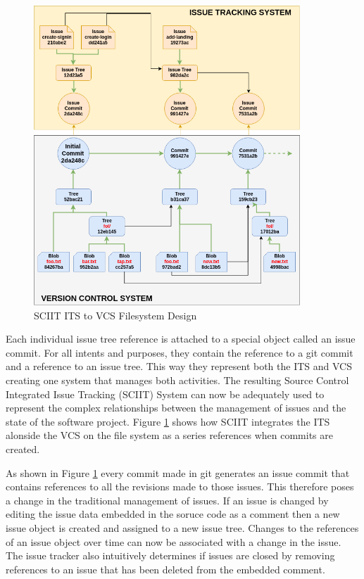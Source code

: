 \documentclass{mproj}
\begin{document}
\begin{figure}[t]
\caption{SCIIT ITS to VCS Filesystem Design}
\label{fig:sciit-filesystem}
\centering
\includegraphics[width=10cm]{sciit-filesystem}
\end{figure}


Each individual issue tree reference is attached to a special object called an issue commit. For all intents and purposes, they contain the reference to a git commit and a reference to an issue tree. This way they represent both the ITS and VCS creating one system that manages both activities. The resulting Source Control Integrated Issue Tracking (SCIIT) System can now be adequately used to represent the complex relationships between the management of issues and the state of the software project. Figure \ref{fig:sciit-filesystem} shows how SCIIT integrates the ITS alonside the VCS on the file system as a series references when commits are created.

As shown in Figure \ref{fig:sciit-filesystem} every commit made in git generates an issue commit that contains references to all the revisions made to those issues. This therefore poses a change in the traditional management of issues. If an issue is changed by editing the issue data embedded in the soruce code as a comment then a new issue object is created and assigned to a new issue tree. Changes to the references of an issue object over time can now be associated with a change in the issue. The issue tracker also intuitively determines if issues are closed by removing references to an issue that has been deleted from the embedded comment.
\end{document}
